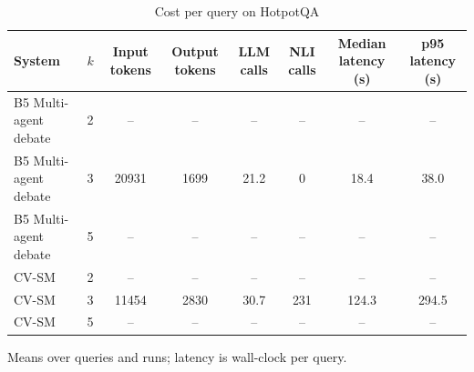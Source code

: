 \begin{table}[!t]
\centering
\caption{Cost per query on HotpotQA}
\label{tab:cost}
\footnotesize
\begin{tabular}{lccccccc}
\hline
System & $k$ & Input tokens & Output tokens & LLM calls & NLI calls & Median latency (s) & p95 latency (s) \\
\hline
B5 Multi-agent debate & 2 & -- & -- & -- & -- & -- & -- \\
B5 Multi-agent debate & 3 & 20931 & 1699 & 21.2 & 0 & 18.4 & 38.0 \\
B5 Multi-agent debate & 5 & -- & -- & -- & -- & -- & -- \\
CV-SM & 2 & -- & -- & -- & -- & -- & -- \\
CV-SM & 3 & 11454 & 2830 & 30.7 & 231 & 124.3 & 294.5 \\
CV-SM & 5 & -- & -- & -- & -- & -- & -- \\
\hline
\end{tabular}
\par\smallskip\parbox{\textwidth}{\footnotesize Means over queries and runs; latency is wall-clock per query.}
\end{table}
